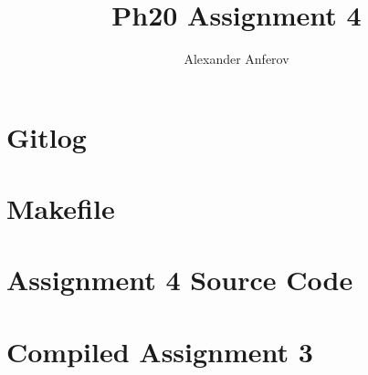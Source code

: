 \documentclass{scrartcl}
\title{Ph20 Assignment 4}
\author{Alexander Anferov}
\begin{document}
\maketitle
\section{Gitlog}

\section{Makefile}

\section{Assignment 4 Source Code}

\section{Compiled Assignment 3}

\end{document}
